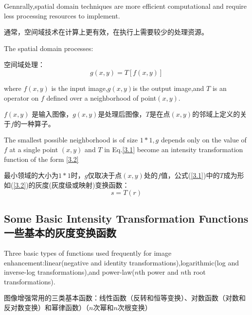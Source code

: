\documentclass[12pt]{article}
\numberwithin{equation}{section}%
\begin{document}
Gennrally,spatial domain techniques are more efficient computational and require less processing resources to implement.

通常，空间域技术在计算上更有效，在执行上需要较少的处理资源。

The spatial domain processes:

空间域处理：
\begin{equation} \label{3.1}  %
g(x,y)=T[f(x,y)]
\end{equation}

 where $f(x,y)$ is the input image,$g(x,y)$is the output image,and $T$ is an operator on $f$ defined over a neighborhood of point$(x,y)$.

 $f(x,y)$ 是输入图像，$g(x,y)$是处理后图像，$T$是在点$(x,y)$的邻域上定义的关于$f$的一种算子。

The smallest possible neighborhood is of size $1*1,g$ depends only on the value of $f$ at a single point $(x,y)$ and $T$ in Eq.\ref{3.1} become an intensity transformation function of the form \ref{3.2}

最小领域的大小为$1*1$时，$g$仅取决于点$(x,y)$处的$f$值，公式(\ref{3.1})中的$T$成为形如(\ref{3.2})的灰度(灰度级或映射)变换函数：
\begin{equation} \label{3.2}   %
 s=T(r) 
\end{equation}
\subsection{Some Basic Intensity Transformation Functions一些基本的灰度变换函数}

Three basic types of functions used frequently for image enhancement:linear(negative and identity transformations),logarithmic(log and inverse-log transformations),and power-law($n$th power and $n$th root transformations).

图像增强常用的三类基本函数：线性函数（反转和恒等变换）、对数函数（对数和反对数变换）和幂律函数）（$n$次幂和$n$次根变换）
\end{document}
